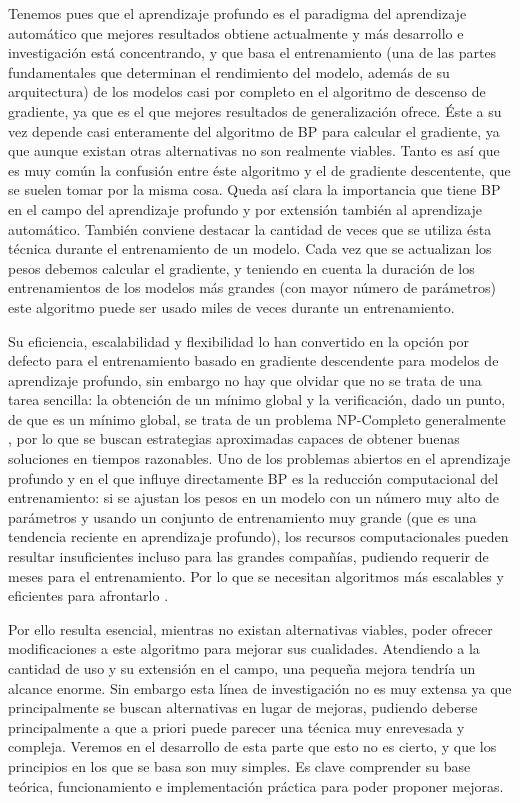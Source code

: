 Tenemos pues que el aprendizaje profundo es el paradigma del aprendizaje automático que mejores resultados obtiene actualmente y más desarrollo e investigación está concentrando, y que basa el entrenamiento (una de las partes fundamentales que determinan el rendimiento del modelo, además de su arquitectura) de los modelos casi por completo en el algoritmo de descenso de gradiente, ya que es el que mejores resultados de generalización ofrece. Éste a su vez depende casi enteramente del algoritmo de BP para calcular el gradiente, ya que aunque existan otras alternativas no son realmente viables. Tanto es así que es muy común la confusión entre éste algoritmo y el de gradiente descentente, que se suelen tomar por la misma cosa. Queda así clara la importancia que tiene BP en el campo del aprendizaje profundo y por extensión también al aprendizaje automático. También conviene destacar la cantidad de veces que se utiliza ésta técnica durante el entrenamiento de un modelo. Cada vez que se actualizan los pesos debemos calcular el gradiente, y teniendo en cuenta la duración de los entrenamientos de los modelos más grandes (con mayor número de parámetros) este algoritmo puede ser usado miles de veces durante un entrenamiento.

Su eficiencia, escalabilidad y flexibilidad lo han convertido en la opción por defecto para el entrenamiento basado en gradiente descendente para modelos de aprendizaje profundo, sin embargo no hay que olvidar que no se trata de una tarea sencilla: la obtención de un mínimo global y la verificación, dado un punto, de que es un mínimo global, se trata de un problema NP-Completo generalmente \cite{NPHardProblem}, por lo que se buscan estrategias aproximadas capaces de obtener buenas soluciones en tiempos razonables. Uno de los problemas abiertos en el aprendizaje profundo y en el que influye directamente BP es la reducción computacional del entrenamiento: si se ajustan los pesos en un modelo con un número muy alto de parámetros y usando un conjunto de entrenamiento muy grande (que es una tendencia reciente en aprendizaje profundo), los recursos computacionales pueden resultar insuficientes incluso para las grandes compañías, pudiendo requerir de meses para el  entrenamiento. Por lo que se necesitan algoritmos más escalables y eficientes para afrontarlo \cite{Problem3_accel}.

Por ello resulta esencial, mientras no existan alternativas viables, poder ofrecer modificaciones a este algoritmo para mejorar sus cualidades. Atendiendo a la cantidad de uso y su extensión en el campo, una pequeña mejora tendría un alcance enorme. Sin embargo esta línea de investigación no es muy extensa ya que principalmente se buscan alternativas en lugar de mejoras, pudiendo deberse principalmente a que a priori puede parecer una técnica muy enrevesada y compleja. Veremos en el desarrollo de esta parte que esto no es cierto, y que los principios en los que se basa son muy simples. Es clave comprender su base teórica, funcionamiento e implementación práctica para poder proponer mejoras. 


